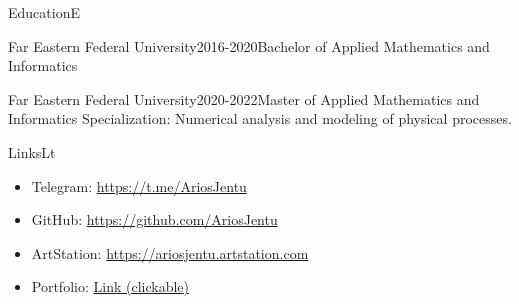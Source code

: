 \documentclass[10pt]{extarticle}
\begin{document}
	\UpdatePosition
	
	\begin{centralpart}{Education}{E}{}
		\begin{titleblock}{Far Eastern Federal University}{2016-2020}{Bachelor of Applied Mathematics and Informatics}{}
		\end{titleblock}
		\begin{titleblock}{Far Eastern Federal University}{2020-2022}{Master of Applied Mathematics and Informatics}{}
			Specialization: Numerical analysis and modeling of physical processes.
		\end{titleblock}
	\end{centralpart}

	\UpdatePosition
	\begin{centralpart}{Links}{L}{t}
		\begin{titleblock}{}{}{}{}
			\vspace*{-25pt}
			\begin{itemize}[label=$\circ$]
				\item Telegram: {\color{sidetopsep}\href{https://t.me/AriosJentu}{https://t.me/AriosJentu}} \vp
				\item GitHub: {\color{sidetopsep}\href{https://github.com/AriosJentu}{https://github.com/AriosJentu}} \vp
				\item ArtStation: {\color{sidetopsep}\href{https://AriosJentu.artstation.com/}{https://ariosjentu.artstation.com}} \vp
				\item Portfolio: {\color{sidetopsep}\href{https://drive.google.com/drive/folders/1hcmudyfBtrOo7_3qARUckmqdiUvxr0jT?usp=drive_link}{Link (clickable)}} \vp
			\end{itemize}
		\end{titleblock}
	\end{centralpart}


	\BottomSignature
\end{document}

